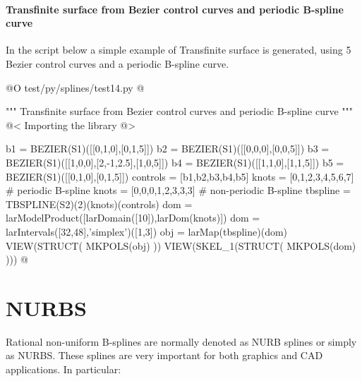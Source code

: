 \documentclass[11pt,oneside]{article}	%
\begin{document}
\paragraph{Transfinite surface from Bezier control curves and periodic B-spline curve}

In the script below a simple example of Transfinite surface is generated, using 5
Bezier control curves and a periodic B-spline curve.

@O test/py/splines/test14.py
@{""" Transfinite surface from Bezier control curves and periodic B-spline curve """
@< Importing the library @>

b1 = BEZIER(S1)([[0,1,0],[0,1,5]])
b2 = BEZIER(S1)([[0,0,0],[0,0,5]])
b3 = BEZIER(S1)([[1,0,0],[2,-1,2.5],[1,0,5]])
b4 = BEZIER(S1)([[1,1,0],[1,1,5]])
b5 = BEZIER(S1)([[0,1,0],[0,1,5]])
controls = [b1,b2,b3,b4,b5]
knots = [0,1,2,3,4,5,6,7]				# periodic B-spline
knots = [0,0,0,1,2,3,3,3]				# non-periodic B-spline
tbspline = TBSPLINE(S2)(2)(knots)(controls) 	
dom = larModelProduct([larDomain([10]),larDom(knots)])
dom = larIntervals([32,48],'simplex')([1,3])
obj = larMap(tbspline)(dom)
VIEW(STRUCT( MKPOLS(obj) ))
VIEW(SKEL_1(STRUCT( MKPOLS(dom) )))
@}



\section{NURBS}


Rational non-uniform B-splines are normally denoted as NURB splines or
simply as NURBS. These splines are very important for both graphics
and CAD applications. In particular:
\end{document}
